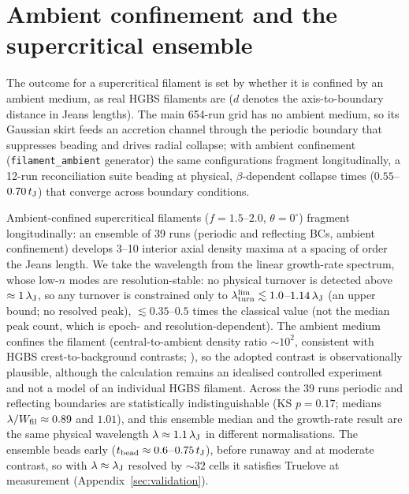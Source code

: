 \documentclass[usenatbib,twoside,twocolumn]{mnras}
\begin{document}
\section{Ambient confinement and the supercritical ensemble}
\label{sec:ambient}


The outcome for a supercritical filament is set by whether it is confined by an ambient medium, as real HGBS filaments are ($d$ denotes the axis-to-boundary distance in Jeans lengths). The main 654-run grid has no ambient medium, so its Gaussian skirt feeds an accretion channel through the periodic boundary that suppresses beading and drives radial collapse; with ambient confinement (\texttt{filament\_ambient} generator) the same configurations fragment longitudinally, a 12-run reconciliation suite beading at physical, $\beta$-dependent collapse times ($0.55$--$0.70\,t_{\rm J}$) that converge across boundary conditions.

Ambient-confined supercritical filaments ($f=1.5$--$2.0$, $\theta=0^\circ$) fragment longitudinally: an ensemble of 39 runs (periodic and reflecting BCs, ambient confinement) develops 3--10 interior axial density maxima at a spacing of order the Jeans length. We take the wavelength from the linear growth-rate spectrum, whose low-$n$ modes are resolution-stable: no physical turnover is detected above $\approx1\,\lambda_{\rm J}$, so any turnover is constrained only to $\lambda_{\rm turn}^{\rm lim}\lesssim1.0$--$1.14\,\lambda_{\rm J}$ (an upper bound; no resolved peak), $\lesssim0.35$--$0.5$ times the classical value (not the median peak count, which is epoch- and resolution-dependent). The ambient medium confines the filament (central-to-ambient density ratio $\sim10^2$, consistent with HGBS crest-to-background contrasts; \citealt{Arzoumanian2019}), so the adopted contrast is observationally plausible, although the calculation remains an idealised controlled experiment and not a model of an individual HGBS filament. Across the 39 runs periodic and reflecting boundaries are statistically indistinguishable (KS $p=0.17$; medians $\lambda/W_{\rm fil}\approx0.89$ and $1.01$), and this ensemble median and the growth-rate result are the same physical wavelength $\lambda\approx1.1\,\lambda_{\rm J}$ in different normalisations. The ensemble beads early ($t_{\rm bead}\approx0.6$--$0.75\,t_{\rm J}$), before runaway and at moderate contrast, so with $\lambda\approx\lambda_{\rm J}$ resolved by ${\sim}32$ cells it satisfies Truelove at measurement (Appendix~\ref{sec:validation}).
\end{document}
